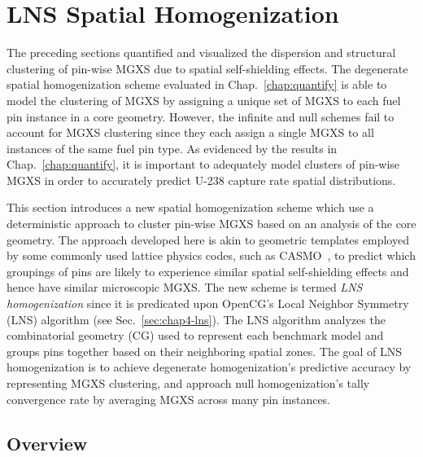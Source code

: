 \section{LNS Spatial Homogenization}
\label{sec:chap9-lns-homogenize}

The preceding sections quantified and visualized the dispersion and structural clustering of pin-wise \ac{MGXS} due to spatial self-shielding effects. The degenerate spatial homogenization scheme evaluated in Chap.~\ref{chap:quantify} is able to model the clustering of \ac{MGXS} by assigning a unique set of \ac{MGXS} to each fuel pin instance in a core geometry. However, the infinite and null schemes fail to account for \ac{MGXS} clustering since they each assign a single \ac{MGXS} to all instances of the same fuel pin type. As evidenced by the results in Chap.~\ref{chap:quantify}, it is important to adequately model clusters of pin-wise \ac{MGXS} in order to accurately predict U-238 capture rate spatial distributions. 

This section introduces a new spatial homogenization scheme which use a deterministic  approach to cluster pin-wise \ac{MGXS} based on an analysis of the core geometry. The approach developed here is akin to geometric templates employed by some commonly used lattice physics codes, such as CASMO~\cite{rhodes2006casmo}, to predict which groupings of pins are likely to experience similar spatial self-shielding effects and hence have similar microscopic \ac{MGXS}. The new scheme is termed \textit{\ac{LNS} homogenization} since it is predicated upon OpenCG's Local Neighbor Symmetry (LNS) algorithm (see Sec.~\ref{sec:chap4-lns}). The \ac{LNS} algorithm analyzes the combinatorial geometry (CG) used to represent each benchmark model and groups pins together based on their neighboring spatial zones. The goal of \ac{LNS} homogenization is to achieve degenerate homogenization's predictive accuracy by representing \ac{MGXS} clustering, and approach null homogenization's tally convergence rate by averaging \ac{MGXS} across many pin instances.

\subsection{Overview}
\label{sec:chap9-lns-overview}

